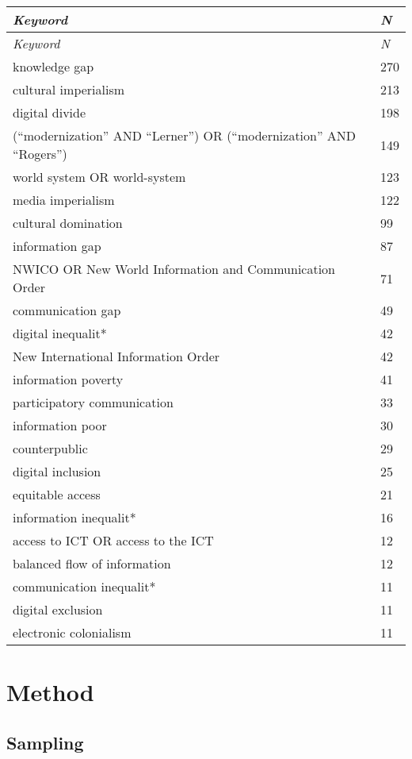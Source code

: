 \documentclass{tufte-handout}
\begin{document}
\tabulinesep=1.1mm
{\begin{longtabu} to 1.05\textwidth { X[l] X[c] } 
\emph{Keyword} & \emph{N} \\
\endfirsthead
\emph{Keyword} & \emph{N} \\
\endhead
knowledge gap & 270 \\
cultural imperialism & 213 \\
digital divide & 198 \\
(``modernization'' AND ``Lerner'') OR (``modernization'' AND ``Rogers'')
& 149 \\
world system OR world-system & 123 \\
media imperialism & 122 \\
cultural domination & 99 \\
information gap & 87 \\
NWICO OR New World Information and Communication Order & 71 \\
communication gap & 49 \\
digital inequalit* & 42 \\
New International Information Order & 42 \\
information poverty & 41 \\
participatory communication & 33 \\
information poor & 30 \\
counterpublic & 29 \\
digital inclusion & 25 \\
equitable access & 21 \\
information inequalit* & 16 \\
access to ICT OR access to the ICT & 12 \\
balanced flow of information & 12 \\
communication inequalit* & 11 \\
digital exclusion & 11 \\
electronic colonialism & 11 \\
\end{longtabu}}

\vspace*{2em}

\hypertarget{method}{%
\section{Method}\label{method}}

\hypertarget{sampling}{%
\subsection{Sampling}\label{sampling}}
\end{document}
